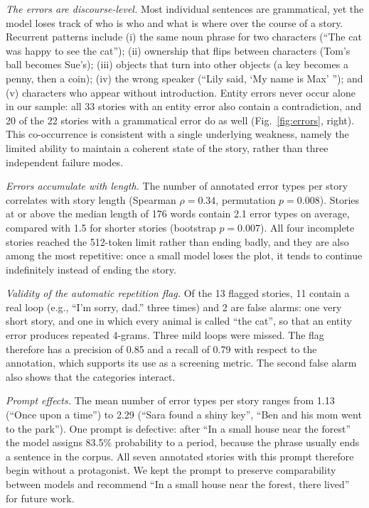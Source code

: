 \documentclass[journal]{IEEEtran}
\begin{document}
\emph{The errors are discourse-level.} Most individual sentences are grammatical, yet the model loses track of who is who and what is where over the course of a story. Recurrent patterns include (i) the same noun phrase for two characters (``The cat was happy to see the cat''); (ii) ownership that flips between characters (Tom's ball becomes Sue's); (iii) objects that turn into other objects (a key becomes a penny, then a coin); (iv) the wrong speaker (``Lily said, `My name is Max' ''); and (v) characters who appear without introduction. Entity errors never occur alone in our sample: all 33 stories with an entity error also contain a contradiction, and 20 of the 22 stories with a grammatical error do as well (Fig.~\ref{fig:errors}, right). This co-occurrence is consistent with a single underlying weakness, namely the limited ability to maintain a coherent state of the story, rather than three independent failure modes.

\emph{Errors accumulate with length.} The number of annotated error types per story correlates with story length (Spearman $\rho=0.34$, permutation $p=0.008$). Stories at or above the median length of 176 words contain 2.1 error types on average, compared with 1.5 for shorter stories (bootstrap $p=0.007$). All four incomplete stories reached the 512-token limit rather than ending badly, and they are also among the most repetitive: once a small model loses the plot, it tends to continue indefinitely instead of ending the story.

\emph{Validity of the automatic repetition flag.} Of the 13 flagged stories, 11 contain a real loop (e.g., ``I'm sorry, dad.'' three times) and 2 are false alarms: one very short story, and one in which every animal is called ``the cat'', so that an entity error produces repeated 4-grams. Three mild loops were missed. The flag therefore has a precision of 0.85 and a recall of 0.79 with respect to the annotation, which supports its use as a screening metric. The second false alarm also shows that the categories interact.

\emph{Prompt effects.} The mean number of error types per story ranges from 1.13 (``Once upon a time'') to 2.29 (``Sara found a shiny key'', ``Ben and his mom went to the park''). One prompt is defective: after ``In a small house near the forest'' the model assigns 83.5\% probability to a period, because the phrase usually ends a sentence in the corpus. All seven annotated stories with this prompt therefore begin without a protagonist. We kept the prompt to preserve comparability between models and recommend ``In a small house near the forest, there lived'' for future work.
\end{document}
